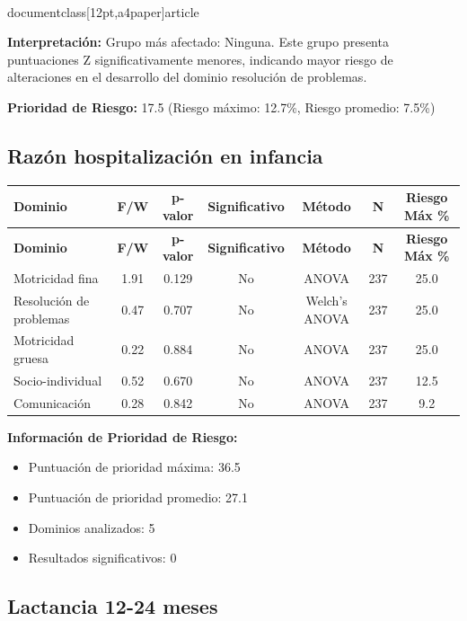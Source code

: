 \\documentclass[12pt,a4paper]{article}
\begin{document}
\textbf{Interpretación:} Grupo más afectado: Ninguna. Este grupo presenta puntuaciones Z significativamente menores, indicando mayor riesgo de alteraciones en el desarrollo del dominio resolución de problemas.

\textbf{Prioridad de Riesgo:} 17.5 (Riesgo máximo: 12.7\%, Riesgo promedio: 7.5\%)


\vspace{0.5cm}


\subsection{Razón hospitalización en infancia}


\begin{longtable}{|l|c|c|c|c|c|c|}
\hline
\textbf{Dominio} & \textbf{F/W} & \textbf{p-valor} & \textbf{Significativo} & \textbf{Método} & \textbf{N} & \textbf{Riesgo Máx \%} \\
\hline
\endfirsthead

\hline
\textbf{Dominio} & \textbf{F/W} & \textbf{p-valor} & \textbf{Significativo} & \textbf{Método} & \textbf{N} & \textbf{Riesgo Máx \%} \\
\hline
\endhead

\hline
\endfoot

\hline
\endlastfoot

Motricidad fina & 1.91 & 0.129 & No & ANOVA & 237 & 25.0 \\
Resolución de problemas & 0.47 & 0.707 & No & Welch's ANOVA & 237 & 25.0 \\
Motricidad gruesa & 0.22 & 0.884 & No & ANOVA & 237 & 25.0 \\
Socio-individual & 0.52 & 0.670 & No & ANOVA & 237 & 12.5 \\
Comunicación & 0.28 & 0.842 & No & ANOVA & 237 & 9.2 \\

\end{longtable}


\textbf{Información de Prioridad de Riesgo:}
\begin{itemize}
\item Puntuación de prioridad máxima: 36.5
\item Puntuación de prioridad promedio: 27.1
\item Dominios analizados: 5
\item Resultados significativos: 0
\end{itemize}


\subsection{Lactancia 12-24 meses}
\end{document}
